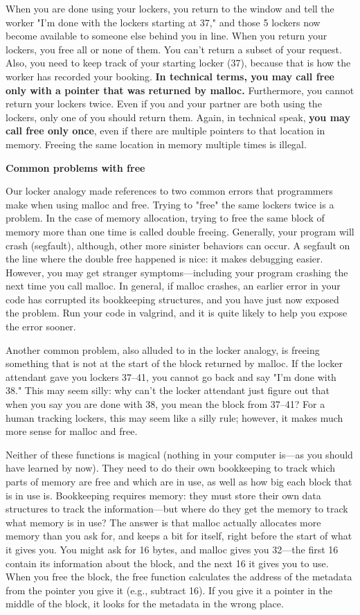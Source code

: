 \documentclass[11pt, a4paper]{article}
\begin{document}
When you are done using your lockers, you return to the window and tell the worker "I'm done with the lockers starting at 37," and those 5 lockers now become available to someone else behind you in line. When you return your lockers, you free all or none of them. You can't return a subset of your request. Also, you need to keep track of your starting locker (37), because that is how the worker has recorded your booking. \textbf{In technical terms, you may call free only with a pointer that was returned by malloc.} Furthermore, you cannot return your lockers twice. Even if you and your partner are both using the lockers, only one of you should return them. Again, in technical speak, \textbf{you may call free only once}, even if there are multiple pointers to that location in memory. Freeing the same location in memory multiple times is illegal.



\textbf{Common problems with free}


Our locker analogy made references to two common errors that programmers make when using malloc and free. Trying to "free" the same lockers twice is a problem. In the case of memory allocation, trying to free the same block of memory more than one time is called double freeing. Generally, your program will crash (segfault), although, other more sinister behaviors can occur. A segfault on the line where the double free happened is nice: it makes debugging easier. However, you may get stranger symptoms—including your program crashing the next time you call malloc. In general, if malloc crashes, an earlier error in your code has corrupted its bookkeeping structures, and you have just now exposed the problem. Run your code in valgrind, and it is quite likely to help you expose the error sooner.

Another common problem, also alluded to in the locker analogy, is freeing something that is not at the start of the block returned by malloc. If the locker attendant gave you lockers 37–41, you cannot go back and say "I'm done with 38." This may seem silly: why can’t the locker attendant just figure out that when you say you are done with 38, you mean the block from 37–41? For a human tracking lockers, this may seem like a silly rule; however, it makes much more sense for malloc and free.

Neither of these functions is magical (nothing in your computer is—as you should have learned by now). They need to do their own bookkeeping to track which parts of memory are free and which are in use, as well as how big each block that is in use is. Bookkeeping requires memory: they must store their own data structures to track the information—but where do they get the memory to track what memory is in use? The answer is that malloc actually allocates more memory than you ask for, and keeps a bit for itself, right before the start of what it gives you. You might ask for 16 bytes, and malloc gives you 32—the first 16 contain its information about the block, and the next 16 it gives you to use. When you free the block, the free function calculates the address of the metadata from the pointer you give it (e.g., subtract 16). If you give it a pointer in the middle of the block, it looks for the metadata in the wrong place.
\end{document}
